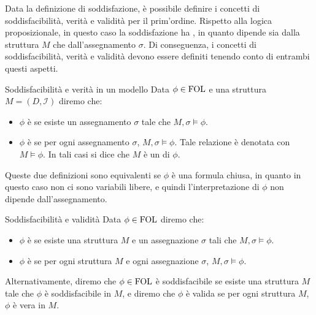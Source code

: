 Data la definizione di soddisfazione, è possibile definire i concetti di soddisfacibilità, verità e validità per il prim'ordine. Rispetto alla logica proposizionale, in questo caso la soddisfazione ha , in quanto dipende sia dalla struttura \(M\) che dall'assegnamento \(\sigma\). Di conseguenza, i concetti di soddisfacibilità, verità e validità devono essere definiti tenendo conto di entrambi questi aspetti.

\begin{definition}{Soddisfacibilità e verità in un modello}
  Data \(\phi \in \FOL\) e una struttura \(M = (D, \mathcal{I}) \) diremo che:

  \begin{itemize}
    \item \(\phi\) è  se esiste un assegnamento \(\sigma\) tale che \(M,\sigma\models \phi\).
    \item \(\phi\) è  se per ogni assegnamento \(\sigma\), \(M,\sigma\models \phi\). Tale relazione è denotata con \(M\models \phi\). In tali casi si dice che \(M\) è un  di \(\phi\).
  \end{itemize}

  Queste due definizioni sono equivalenti se \(\phi\) è una formula chiusa, in quanto in questo caso non ci sono variabili libere, e quindi l'interpretazione di \(\phi\) non dipende dall'assegnamento. 

\end{definition}

\begin{definition}{Soddisfacibilità e validità}
  Data \(\phi \in \FOL\) diremo che:

  \begin{itemize}
    \item \(\phi\) è  se esiste una struttura \(M\) e un assegnazione \(\sigma\) tali che \(M,\sigma\models \phi\).
    \item \(\phi\) è  se per ogni struttura \(M\) e ogni assegnazione \(\sigma\), \(M,\sigma\models \phi\).
  \end{itemize}
  
\end{definition}

Alternativamente, diremo che \(\phi \in \FOL\) è soddisfacibile se esiste una struttura \(M\) tale che \(\phi\) è soddisfacibile in \(M\), e diremo che \(\phi\) è valida se per ogni struttura \(M\), \(\phi\) è vera in \(M\). 

